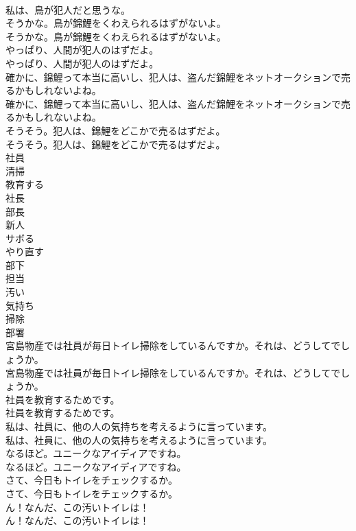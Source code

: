 \documentclass[8pt]{extreport}
\begin{document}
\begin{CJK}{UTF8}{min}
\\	私は、鳥が犯人だと思うな。 
\\	そうかな。鳥が錦鯉をくわえられるはずがないよ。	
\\	そうかな。鳥が錦鯉をくわえられるはずがないよ。 
\\	やっぱり、人間が犯人のはずだよ。	
\\	やっぱり、人間が犯人のはずだよ。 
\\	確かに、錦鯉って本当に高いし、犯人は、盗んだ錦鯉をネットオークションで売るかもしれないよね。	
\\	確かに、錦鯉って本当に高いし、犯人は、盗んだ錦鯉をネットオークションで売るかもしれないよね。 
\\	そうそう。犯人は、錦鯉をどこかで売るはずだよ。	
\\	そうそう。犯人は、錦鯉をどこかで売るはずだよ。 
\\	社員
\\	清掃
\\	教育する
\\	社長
\\	部長
\\	新人
\\	サボる
\\	やり直す
\\	部下
\\	担当
\\	汚い
\\	気持ち
\\	掃除
\\	部署
\\	宮島物産では社員が毎日トイレ掃除をしているんですか。それは、どうしてでしょうか。	
\\	宮島物産では社員が毎日トイレ掃除をしているんですか。それは、どうしてでしょうか。 
\\	社員を教育するためです。	
\\	社員を教育するためです。 
\\	私は、社員に、他の人の気持ちを考えるように言っています。	
\\	私は、社員に、他の人の気持ちを考えるように言っています。 
\\	なるほど。ユニークなアイディアですね。	
\\	なるほど。ユニークなアイディアですね。 
\\	さて、今日もトイレをチェックするか。	
\\	さて、今日もトイレをチェックするか。 
\\	ん！なんだ、この汚いトイレは！	
\\	ん！なんだ、この汚いトイレは！ 

\end{CJK}
\end{document}
